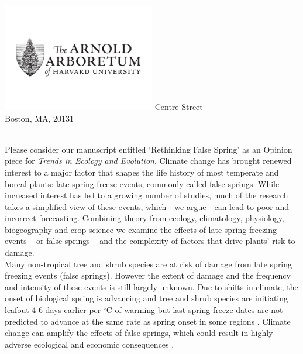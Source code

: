 \documentclass[11pt,a4paper]{article}\usepackage[]{graphicx}\usepackage[]{color}
\begin{document}
\includegraphics[width=0.5\textwidth, right]{AA_logo.jpg}
 Centre Street\\
\noindent Boston, MA, 20131\\


\vspace{1.5ex}




\vspace{3ex}\\
\noindent Please consider our manuscript entitled `Rethinking False Spring' as an Opinion piece for \textit{Trends in Ecology and Evolution}. Climate change has brought renewed interest to a major factor that shapes the life history of most temperate and boreal plants: late spring freeze events, commonly called false springs. While increased interest has led to a growing number of studies, much of the research takes a simplified view of these events, which---we argue---can lead to poor and incorrect forecasting. Combining theory from ecology, climatology, physiology, biogeography and crop science we examine the effects of late spring freezing events -- or false springs -- and the complexity of factors that drive plants' risk to damage.\\

\noindent Many non-tropical tree and shrub species are at risk of damage from late spring freezing events (false springs). However the extent of damage and the frequency and intensity of these events is still largely unknown. Due to shifts in climate, the onset of biological spring is advancing and tree and shrub species are initiating leafout 4-6 days earlier per $^{\circ}$C of warming \citep{Wolkovich2012, Polgar2014} but last spring freeze dates are not predicted to advance at the same rate as spring onset in some regions \citep{Labe2016}. Climate change can amplify the effects of false springs, which could result in highly adverse ecological and economic consequences \citep{Ault2013, Vitra2017}. \\
\end{document}
